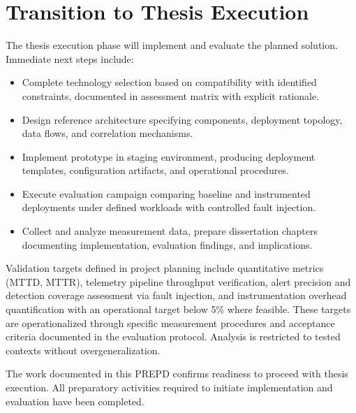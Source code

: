 \section{Transition to Thesis Execution}

The thesis execution phase will implement and evaluate the planned solution. Immediate next steps include:

\begin{itemize}
	\item Complete technology selection based on compatibility with identified constraints, documented in assessment matrix with explicit rationale.
	\item Design reference architecture specifying components, deployment topology, data flows, and correlation mechanisms.
	\item Implement prototype in staging environment, producing deployment templates, configuration artifacts, and operational procedures.
	\item Execute evaluation campaign comparing baseline and instrumented deployments under defined workloads with controlled fault injection.
	\item Collect and analyze measurement data, prepare dissertation chapters documenting implementation, evaluation findings, and implications.
\end{itemize}

Validation targets defined in project planning include quantitative metrics (\ac{MTTD}, \ac{MTTR}), telemetry pipeline throughput verification, alert precision and detection coverage assessment via fault injection, and instrumentation overhead quantification with an operational target below 5\% where feasible. These targets are operationalized through specific measurement procedures and acceptance criteria documented in the evaluation protocol. Analysis is restricted to tested contexts without overgeneralization.

The work documented in this \ac{PREPD} confirms readiness to proceed with thesis execution. All preparatory activities required to initiate implementation and evaluation have been completed.

